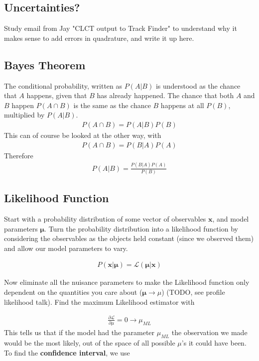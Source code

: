 \subsection{Uncertainties?}
Study email from Jay "CLCT output to Track Finder" to understand why it makes sense to add errors in quadrature, and write it up here.


\subsection{Bayes Theorem}
The conditional probability, written as $P(A|B)$ is understood as the chance that $A$ happens, given that $B$ has already happened. The chance that both $A$ and $B$ happen $P(A \cap B)$ is the same as the chance $B$ happens at all $P(B)$, multiplied by $P(A|B)$.
\begin{align}
P(A\cap B) = P(A|B)P(B)
\end{align}
This can of course be looked at the other way, with
\begin{align}
P(A\cap B) = P(B|A)P(A)
\end{align}
Therefore
\begin{align}
P(A|B) = \frac{P(B|A)P(A)}{P(B)}
\end{align}

\subsection{Likelihood Function}

Start with a probability distribution of some vector of observables $\textbf{x}$, and model parameters $\boldsymbol{\mu}$. Turn the probability distribution into a likelihood function by considering the observables as the objects held constant (since we observed them) and allow our model parameters to vary.

\begin{align}
	P(\textbf{x}|\boldsymbol{\mu}) = \mathcal{L}(\boldsymbol{\mu}|\textbf{x})
\end{align}


Now eliminate all the nuisance parameters to make the Likelihood function only dependent on the quantities you care about ($\boldsymbol{\mu}\rightarrow \mu$) (TODO, see profile likelihood talk). Find the maximum Likelihood estimator with

\begin{align}
\frac{\partial \mathcal{L}}{\partial \mu} = 0 \rightarrow \mu_{ML}
\end{align}
This tells us that if the model had the parameter $\mu_{ML}$ the observation we made would be the most likely, out of the space of all possible $\mu$'s it could have been. To find the \textbf{confidence interval}, we use

